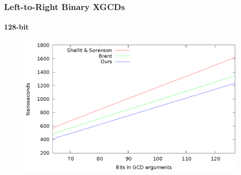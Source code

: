\documentclass{beamer}
\begin{document}
\begin{frame}
\frametitle{Left-to-Right Binary XGCDs}
\framesubtitle{128-bit}
\begin{figure}
\includegraphics[scale=0.86]{xgcds-binary-128}
\end{figure}
\end{frame}
\end{document}
